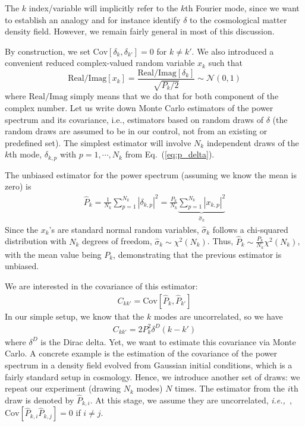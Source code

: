 \documentclass{aastex6}
\newcommand{\ie}{{\textit{i.e.,}~}}
\newcommand{\equref}[1]{{\xspace}Eq.~(\ref{#1})}
\newcommand{\equ}[1]{\begin{equation}#1\end{equation}}
\newcommand{\eqn}[1]{\begin{eqnarray}#1\end{eqnarray}}
\begin{document}
The $k$ index/variable will implicitly refer to the $k$th Fourier mode, since we want to establish an analogy and for instance identify $\delta$ to the cosmological matter density field. However, we remain fairly general in most of this discussion.

By construction, we set $\mathrm{Cov}[\delta_k, \delta_{k'}] = 0$ for $k\neq k'$. We also introduced a convenient reduced complex-valued random variable $x_k$ such that
\equ{
	\mathrm{Real/Imag}[x_k] = \frac{\mathrm{Real/Imag}[\delta_k] }{ \sqrt{P_k/2}} \sim \mathcal{N}(0, 1)
}
where $\mathrm{Real/Imag}$ simply means that we do that for both component of the complex number.
Let us write down Monte Carlo estimators of the power spectrum and its covariance, i.e., estimators based on random draws of $\delta$ (the random draws are assumed to be in our control, not from an existing or predefined set). The simplest estimator will involve $N_k$ independent draws of the $k$th mode, $\delta_{k,p}$ with $p=1, \cdots, N_k$ from \equref{eq:p_delta}. 

The unbiased estimator for the power spectrum (assuming we know the mean is zero) is
\eqn{
	\hat{P}_{k} = \frac{1}{N_k} \sum_{p=1}^{N_k} |\delta_{k,p}|^2 =\frac{P_k}{N_k } \underbrace{\sum_{p=1}^{N_k} |x_{k,p}|^2 }_{\hat{\sigma}_k}
}
Since the $x_k$'s are standard normal random variables, $\hat{\sigma}_k$ follows a chi-squared distribution with $N_k$ degrees of freedom, $\hat{\sigma}_k \sim \chi^2(N_k)$. 
Thus, $\hat{P}_{k} \sim \frac{P_k}{N_k }  \chi^2(N_k)$, with the mean value being $P_k$, demonstrating that the previous estimator is unbiased.

We are interested in the covariance of this estimator:
\eqn{
	C_{kk'} = \mathrm{Cov}[\hat{P}_{k}, \hat{P}_{k'}]
}
In our simple setup, we know that the $k$ modes are uncorrelated, so we have
\eqn{
	C_{kk'} = 2{P}^2_{k} \delta^D(k-k')
}
where $ \delta^D$ is the Dirac delta. Yet, we want to estimate this covariance via Monte Carlo.
A concrete example is the estimation of the covariance of the power spectrum in a density field evolved from Gaussian initial conditions, which is a fairly standard setup in cosmology.
Hence, we introduce another set of draws: we repeat our experiment (drawing $N_k$ modes) $N$ times. The estimator from the $i$th draw is denoted by $\hat{P}_{k, i}$. 
At this stage, we assume they are uncorrelated, \ie, $\mathrm{Cov}[\hat{P}_{k, i}\hat{P}_{k, j}] = 0$ if $i\neq j$.
\end{document}
